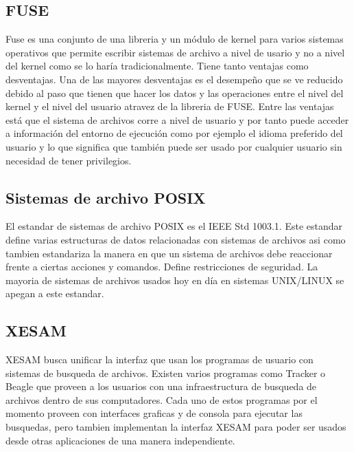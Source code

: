 \subsection{FUSE}
\label{fuse}

Fuse es una conjunto de una libreria y un módulo de kernel para varios sistemas operativos que permite escribir sistemas de archivo a nivel de usario y no a nivel del kernel como se lo haría tradicionalmente. Tiene tanto ventajas como desventajas. Una de las mayores desventajas es el desempeño que se ve reducido debido al paso que tienen que hacer los datos y las operaciones entre el nivel del kernel y el nivel del usuario atravez de la libreria de FUSE. Entre las ventajas está que el sistema de archivos corre a nivel de usuario y por tanto puede acceder a información del entorno de ejecución como por ejemplo el idioma preferido del usuario y lo que significa que también puede ser usado por cualquier usuario sin necesidad de tener privilegios.

\subsection{Sistemas de archivo POSIX}
\label{posix}

El estandar de sistemas de archivo POSIX es el IEEE Std 1003.1. Este estandar define varias estructuras de datos relacionadas con sistemas de archivos asi como tambien estandariza la manera en que un sistema de archivos debe reaccionar frente a ciertas acciones y comandos. Define restricciones de seguridad. La mayoria de sistemas de archivos usados hoy en día en sistemas UNIX/LINUX se apegan a este estandar.

\subsection{XESAM}
\label{xesam}

XESAM busca unificar la interfaz que usan los programas de usuario con sistemas de busqueda de archivos. Existen varios programas como Tracker o Beagle que proveen a los usuarios con una infraestructura de busqueda de archivos dentro de sus computadores. Cada uno de estos programas por el momento proveen con interfaces graficas y de consola para ejecutar las busquedas, pero tambien implementan la interfaz XESAM para poder ser usados desde otras aplicaciones de una manera independiente.


